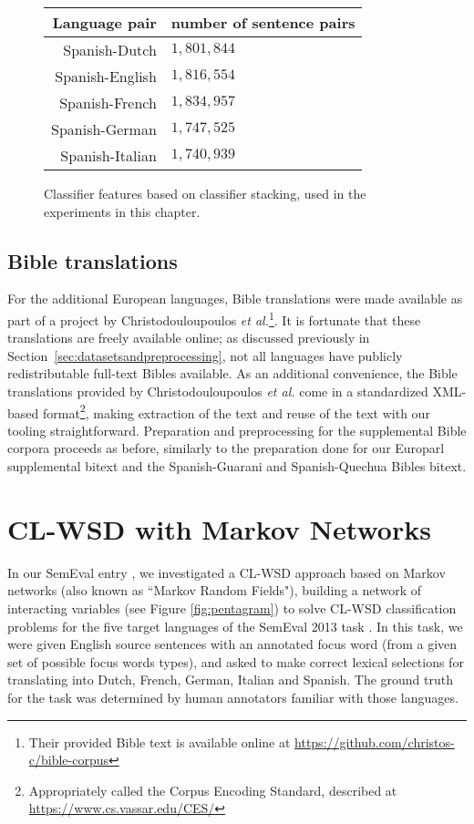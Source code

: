 \begin{figure*}
  \begin{centering}
  \begin{tabular}{|r|l|}
    \hline
    Language pair & number of sentence pairs \\
    \hline
    Spanish-Dutch & $1,801,844$ \\
    \hline
    Spanish-English & $1,816,554$ \\
    \hline
    Spanish-French & $1,834,957$ \\
    \hline
    Spanish-German & $1,747,525$ \\
    \hline
    Spanish-Italian & $1,740,939$ \\
    \hline
  \end{tabular}
  \end{centering}
  \caption{Classifier features based on classifier stacking, used in the
  experiments in this chapter.}
  \label{fig:europarlsize}
\end{figure*}

\subsection{Bible translations}

For the additional European languages, Bible translations were made available
as part of a project by Christodouloupoulos \emph{et
al.}\cite{Christodouloupoulos2015}\footnote{Their provided Bible text is
available online at \url{https://github.com/christos-c/bible-corpus}}. It is
fortunate that these translations are freely available online; as discussed
previously in Section~\ref{sec:datasetsandpreprocessing}, not all languages
have publicly redistributable full-text Bibles available. As an additional
convenience, the Bible translations provided by Christodouloupoulos \emph{et
al.} come in a standardized XML-based format\footnote{Appropriately called the
Corpus Encoding Standard, described at \url{https://www.cs.vassar.edu/CES/}},
making extraction of the text and reuse of the text with our tooling
straightforward. Preparation and preprocessing for the supplemental Bible
corpora proceeds as before, similarly to the preparation done for our Europarl
supplemental bitext and the Spanish-Guarani and Spanish-Quechua Bibles bitext.

\section{CL-WSD with Markov Networks}
\label{sec:multilingual-mrf}
In our SemEval entry \cite{rudnick-liu-gasser:2013:SemEval-2013}, we
investigated a CL-WSD approach based on Markov networks (also known as ``Markov
Random Fields"), building a network of interacting variables (see Figure
\ref{fig:pentagram}) to solve CL-WSD classification problems for the five
target languages of the SemEval 2013 task \cite{task10}. In this task, we were
given English source sentences with an annotated focus word (from a given set
of possible focus words types), and asked to make correct lexical selections
for translating into Dutch, French, German, Italian and Spanish. The ground
truth for the task was determined by human annotators familiar with those
languages.

